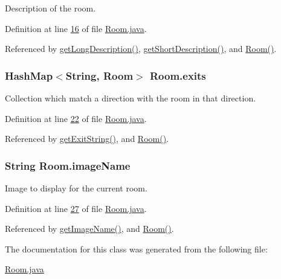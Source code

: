 Description of the room. 



Definition at line \hyperlink{Room_8java_source_l00016}{16} of file \hyperlink{Room_8java_source}{Room.\-java}.



Referenced by \hyperlink{Room_8java_source_l00118}{get\-Long\-Description()}, \hyperlink{Room_8java_source_l00109}{get\-Short\-Description()}, and \hyperlink{Room_8java_source_l00039}{Room()}.

\hypertarget{classRoom_a29620da10d44de49ee8557e037f014af}{
\subsubsection[{exits}]{\setlength{\rightskip}{0pt plus 5cm}Hash\-Map$<$String, {\bf Room}$>$ Room.\-exits\hspace{0.3cm}{\ttfamily [private]}}}\label{classRoom_a29620da10d44de49ee8557e037f014af}


Collection which match a direction with the room in that direction. 



Definition at line \hyperlink{Room_8java_source_l00022}{22} of file \hyperlink{Room_8java_source}{Room.\-java}.



Referenced by \hyperlink{Room_8java_source_l00156}{get\-Exit\-String()}, and \hyperlink{Room_8java_source_l00049}{Room()}.

\hypertarget{classRoom_a3ddf7c120b54509c43d803d2409158fc}{
\subsubsection[{image\-Name}]{\setlength{\rightskip}{0pt plus 5cm}String Room.\-image\-Name\hspace{0.3cm}{\ttfamily [private]}}}\label{classRoom_a3ddf7c120b54509c43d803d2409158fc}


Image to display for the current room. 



Definition at line \hyperlink{Room_8java_source_l00027}{27} of file \hyperlink{Room_8java_source}{Room.\-java}.



Referenced by \hyperlink{Room_8java_source_l00185}{get\-Image\-Name()}, and \hyperlink{Room_8java_source_l00049}{Room()}.



The documentation for this class was generated from the following file\-:\begin{DoxyCompactItemize}
\item 
\hyperlink{Room_8java}{Room.\-java}\end{DoxyCompactItemize}
